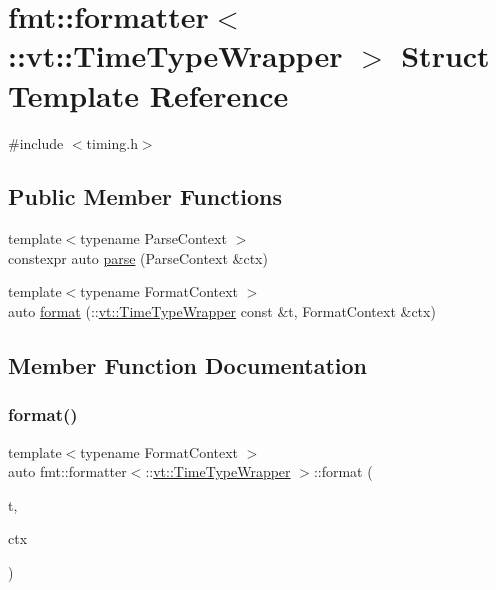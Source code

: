 \hypertarget{structfmt_1_1formatter_3_1_1vt_1_1_time_type_wrapper_01_4}{}\section{fmt\+:\+:formatter$<$\+:\+:vt\+:\+:Time\+Type\+Wrapper $>$ Struct Template Reference}
\label{structfmt_1_1formatter_3_1_1vt_1_1_time_type_wrapper_01_4}


{\ttfamily \#include $<$timing.\+h$>$}

\subsection*{Public Member Functions}
\begin{DoxyCompactItemize}
\item 
{\footnotesize template$<$typename Parse\+Context $>$ }\\constexpr auto \hyperlink{structfmt_1_1formatter_3_1_1vt_1_1_time_type_wrapper_01_4_a0b55006a7d3e54748f7dff24428b384f}{parse} (Parse\+Context \&ctx)
\item 
{\footnotesize template$<$typename Format\+Context $>$ }\\auto \hyperlink{structfmt_1_1formatter_3_1_1vt_1_1_time_type_wrapper_01_4_a0f50534b9e0277303571f6f3a163e738}{format} (\+::\hyperlink{structvt_1_1_time_type_wrapper}{vt\+::\+Time\+Type\+Wrapper} const \&t, Format\+Context \&ctx)
\end{DoxyCompactItemize}


\subsection{Member Function Documentation}
\mbox{\label{structfmt_1_1formatter_3_1_1vt_1_1_time_type_wrapper_01_4_a0f50534b9e0277303571f6f3a163e738}} 
\subsubsection{\texorpdfstring{format()}{format()}}
{\footnotesize\ttfamily template$<$typename Format\+Context $>$ \\
auto fmt\+::formatter$<$\+::\hyperlink{structvt_1_1_time_type_wrapper}{vt\+::\+Time\+Type\+Wrapper} $>$\+::format (\begin{DoxyParamCaption}\item[{\+::\hyperlink{structvt_1_1_time_type_wrapper}{vt\+::\+Time\+Type\+Wrapper} const \&}]{t,  }\item[{Format\+Context \&}]{ctx }\end{DoxyParamCaption})\hspace{0.3cm}{\ttfamily [inline]}}

